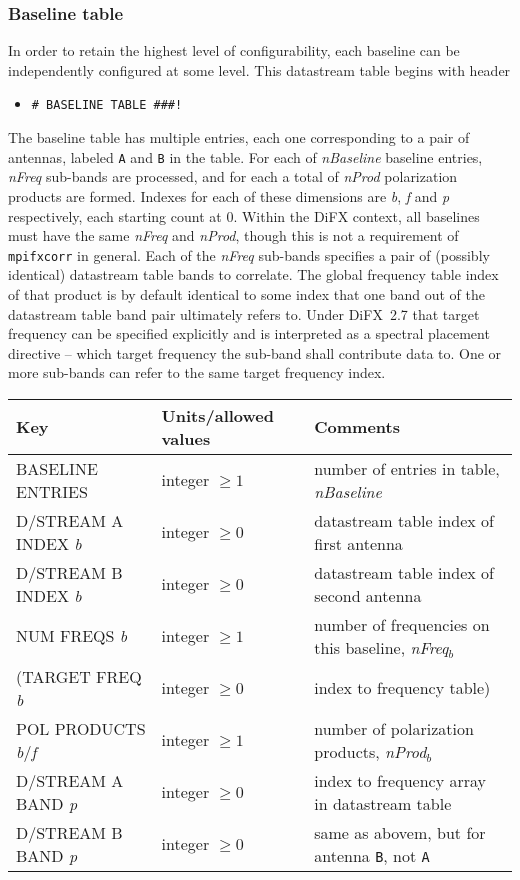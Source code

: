 \subsubsection{Baseline table}

In order to retain the highest level of configurability, each baseline can be independently configured at some level.
This datastream table begins with header 
\begin{itemize}
\item[] {\tt \verb+# BASELINE TABLE ###!+}
\end{itemize}
The baseline table has multiple entries, each one corresponding to a pair of antennas, labeled {\tt A} and {\tt B} in the table.
For each of {\em nBaseline} baseline entries, {\em nFreq} sub-bands are processed, and for each a total of {\em nProd} polarization products are formed.
Indexes for each of these dimensions are {\em b}, {\em f} and {\em p} respectively, each starting count at 0.
Within the DiFX context, all baselines must have the same {\em nFreq} and {\em nProd}, though this is not a requirement of {\tt mpifxcorr} in general.
Each of the {\em nFreq} sub-bands specifies a pair of (possibly identical) datastream table bands to correlate.
The global frequency table index of that product is by default identical to some index that one band out of the datastream table band pair ultimately refers to.
Under DiFX~2.7 that target frequency can be specified explicitly and is interpreted as a spectral placement directive -- which target frequency
the sub-band shall contribute data to. One or more sub-bands can refer to the same target frequency index.

\begin{center}
\begin{tabular}{l l l}
\hline
Key & Units/allowed values & Comments \\
\hline
BASELINE ENTRIES & integer $\ge 1$ & number of entries in table, {\em nBaseline} \\
\hline
D/STREAM A INDEX {\em b} & integer $\ge 0$ & datastream table index of first antenna \\
D/STREAM B INDEX {\em b} & integer $\ge 0$ & datastream table index of second antenna \\
NUM FREQS {\em b} & integer $\ge 1$ & number of frequencies on this baseline, {\em nFreq$_\mathit{b}$} \\
(TARGET FREQ {\em b} & integer $\ge 0$ & index to frequency table) \\
POL PRODUCTS {\em b}/{\em f} & integer $\ge 1$ & number of polarization products, {\em nProd$_\mathit{b}$} \\
D/STREAM A BAND {\em p} & integer $\ge 0$ & index to frequency array in datastream table \\
D/STREAM B BAND {\em p} & integer $\ge 0$ & same as abovem, but for antenna {\tt B}, not {\tt A} \\
\hline
\end{tabular}
\end{center}

